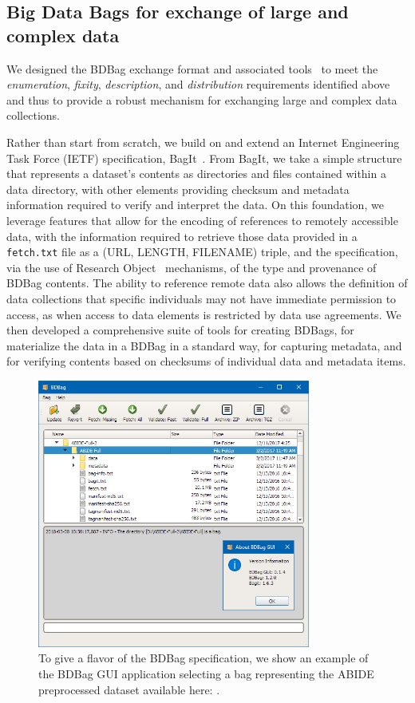 \documentclass[11pt]{article}
\begin{document}
\subsection{Big Data Bags for exchange of large and complex data}

We designed the BDBag exchange format and associated tools~\cite{chard16} to meet the \emph{enumeration}, \emph{fixity}, \emph{description}, and \emph{distribution} requirements identified above
and thus to provide a robust mechanism for exchanging large and complex data collections.

Rather than start from scratch, we build on and extend an Internet Engineering Task Force (IETF) specification,
BagIt~\cite{Kunze2015}.
From BagIt, we take a simple structure that represents a dataset's contents as directories and files contained within a data directory,
with other elements providing checksum and metadata information required to verify and interpret the data. 
On this foundation, we leverage features that allow for the encoding of references to remotely accessible data, with the information required to retrieve those data provided in a \texttt{fetch.txt} file as a (URL, LENGTH, FILENAME) triple, and the specification, via the use of Research Object~\cite{bechhofer2013linked} mechanisms,
of the type and provenance of BDBag contents.  
The ability to reference remote data also allows the definition of data collections that specific individuals may not have immediate permission to access, 
as when access to data elements is restricted by data use agreements.
We then developed a comprehensive suite of tools for creating BDBags, for
materialize the data in a BDBag in a standard way, for capturing metadata, 
and for verifying contents based on checksums of individual data and metadata items.


\begin{figure}
\centering
\includegraphics[width=0.8\textwidth]{figs/bdbag_gui_version.png}
\caption{To give a flavor of the BDBag specification, we show an example of the BDBag GUI application selecting a bag
representing the ABIDE preprocessed dataset available here: .}
\end{figure}
\end{document}
